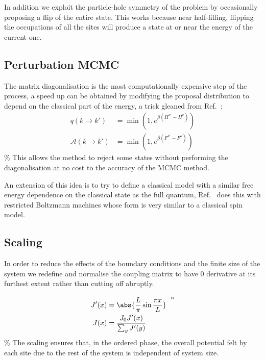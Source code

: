 In addition we exploit the particle-hole symmetry of the problem by occasionally proposing a flip of the entire state. This works because near half-filling, flipping the occupations of all the sites will produce a state at or near the energy of the current one.

\hypertarget{perturbation-mcmc}{%
\subsection{Perturbation MCMC}\label{perturbation-mcmc}}

The matrix diagonalisation is the most computationally expensive step of the process, a speed up can be obtained by modifying the proposal distribution to depend on the classical part of the energy, a trick gleaned from Ref.~\autocite{krauthIntroductionMonteCarlo1998}: \[
\begin{aligned}
q(k \to k') &= \min\left(1, e^{\beta (H^{k'} - H^k)}\right) \\
\mathcal{A}(k \to k') &= \min\left(1, e^{\beta(F^{k'}- F^k)}\right)
\end{aligned}\] \% This allows the method to reject some states without performing the diagonalisation at no cost to the accuracy of the MCMC method.

An extension of this idea is to try to define a classical model with a similar free energy dependence on the classical state as the full quantum, Ref.~\autocite{huangAcceleratedMonteCarlo2017} does this with restricted Boltzmann machines whose form is very similar to a classical spin model.

\hypertarget{scaling}{%
\subsection{Scaling}\label{scaling}}

In order to reduce the effects of the boundary conditions and the finite size of the system we redefine and normalise the coupling matrix to have 0 derivative at its furthest extent rather than cutting off abruptly.

\[
\begin{aligned}
J'(x) &= \abs{\frac{L}{\pi}\sin \frac{\pi x}{L}}^{-\alpha} \\
J(x) &= \frac{J_0 J'(x)}{\sum_y J'(y)}
\end{aligned}\] \% The scaling ensures that, in the ordered phase, the overall potential felt by each site due to the rest of the system is independent of system size.

